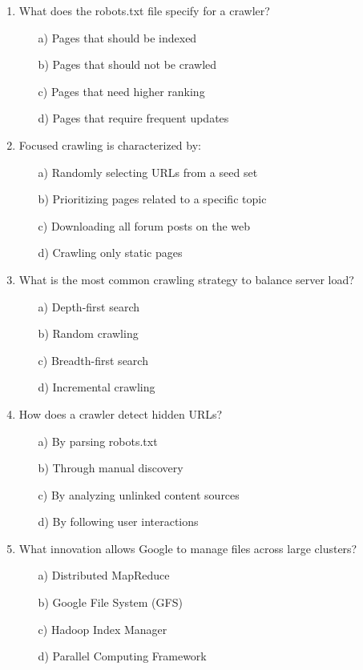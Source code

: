 \documentclass[8pt]{extarticle}
\begin{document}
\begin{multicols}{2}
\begin{enumerate}
\item What does the robots.txt file specify for a crawler?
\begin{itemize}
\item[a)] Pages that should be indexed
\item[b)] Pages that should not be crawled
\item[c)] Pages that need higher ranking
\item[d)] Pages that require frequent updates
\end{itemize}

\item Focused crawling is characterized by:
\begin{itemize}
\item[a)] Randomly selecting URLs from a seed set
\item[b)] Prioritizing pages related to a specific topic
\item[c)] Downloading all forum posts on the web
\item[d)] Crawling only static pages
\end{itemize}

\item What is the most common crawling strategy to balance server load?
\begin{itemize}
\item[a)] Depth-first search
\item[b)] Random crawling
\item[c)] Breadth-first search
\item[d)] Incremental crawling
\end{itemize}

\item How does a crawler detect hidden URLs?
\begin{itemize}
\item[a)] By parsing robots.txt
\item[b)] Through manual discovery
\item[c)] By analyzing unlinked content sources
\item[d)] By following user interactions
\end{itemize}

\item What innovation allows Google to manage files across large clusters?
\begin{itemize}
\item[a)] Distributed MapReduce
\item[b)] Google File System (GFS)
\item[c)] Hadoop Index Manager
\item[d)] Parallel Computing Framework
\end{itemize}


\end{enumerate}
\end{multicols}
\end{document}
